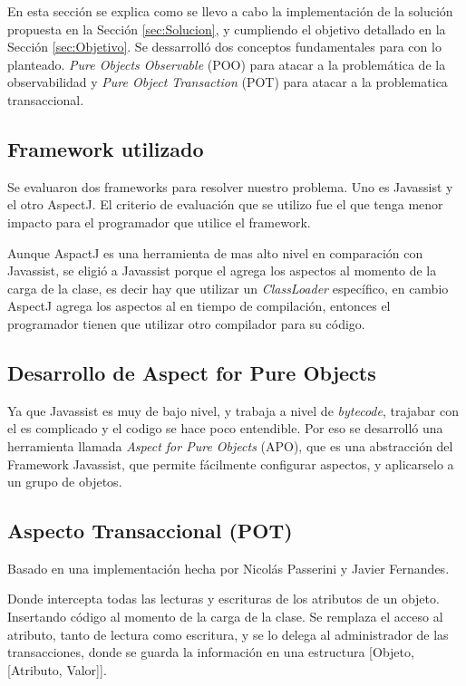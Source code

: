 En esta sección se explica como se llevo a cabo la implementación de la solución
propuesta en la Sección \ref{sec:Solucion}, y cumpliendo el objetivo detallado
en la Sección \ref{sec:Objetivo}. Se dessarrolló dos conceptos fundamentales
para con lo planteado. \emph{Pure Objects Observable} (POO)  para atacar a la
problemática de la observabilidad y \emph{Pure Object Transaction} (POT) para
atacar a la problematica transaccional.
	
	\subsection{Framework utilizado}  

	Se evaluaron dos frameworks para resolver nuestro problema. Uno es Javassist y
	el otro AspectJ. \cite{KiczalesHHKPG01}
	El criterio de evaluación que se utilizo fue el que tenga menor impacto para el
	programador que utilice el framework.

	\medskip 
	Aunque AspactJ es una herramienta de mas alto nivel en comparación con
	Javassist,  se eligió a  Javassist porque el agrega los aspectos al momento de
	la carga de la clase, es decir hay que utilizar un \emph{ClassLoader}
	específico, en cambio AspectJ agrega los aspectos al en tiempo de compilación,
	entonces el programador tienen que utilizar otro compilador para su código.

	\medskip 

	\subsection{Desarrollo de Aspect for Pure Objects}

	Ya que Javassist es muy de bajo nivel, y trabaja a nivel de \emph{bytecode},
	trajabar con el es complicado y el codigo se hace poco entendible. Por eso se
	desarrolló una herramienta llamada \emph{ Aspect for Pure Objects} (APO), que
	es una abstracción del Framework Javassist, que permite fácilmente configurar 
	aspectos, y aplicarselo a un grupo de objetos.

	\subsection{Aspecto Transaccional (POT)} 
		Basado en una implementación
		hecha por Nicolás Passerini y Javier Fernandes.
		 
		Donde intercepta todas las lecturas	y escrituras de los atributos de un
		objeto.	Insertando código al momento de la carga de la clase.
		Se remplaza el acceso al atributo, tanto de lectura como escritura, y se lo
		delega al administrador de las transacciones, donde se guarda la información
		en una estructura [Objeto, [Atributo, Valor]].
		
